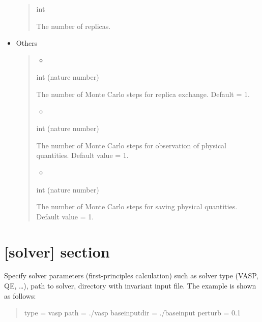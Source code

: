 \documentclass[letterpaper,10pt,english]{sphinxmanual}
\begin{document}
\begin{itemize}
\begin{quote}
 int

 The number of replicas.
\end{quote}

\item {} 
Others
\begin{quote}
\begin{itemize}
\item {} 

\end{itemize}

 int (nature number)

 The number of Monte Carlo steps for replica exchange. Default = 1.
\begin{itemize}
\item {} 

\end{itemize}

 int (nature number)

     The number of Monte Carlo steps for observation of physical quantities. Default value = 1.
\begin{itemize}
\item {} 

\end{itemize}

 int (nature number)

     The number of Monte Carlo steps for saving physical quantities. Default value = 1.
\end{quote}

\end{itemize}


\section{{[}solver{]} section}
\label{\detokenize{file_specification/parameter_solver:solver-section}}\label{\detokenize{file_specification/parameter_solver::doc}}
Specify solver parameters (first-principles calculation) such as solver type (VASP, QE, …), path to solver, directory with invariant input file.
The example is shown as follows:
\begin{quote}

\begin{sphinxVerbatim}[commandchars=\\\{\}]
[solver]
type = \PYGZsq{}vasp\PYGZsq{}
path = \PYGZsq{}./vasp\PYGZsq{}
base\PYGZus{}input\PYGZus{}dir = \PYGZsq{}./baseinput\PYGZsq{}
perturb = 0.1
\end{sphinxVerbatim}
\end{quote}
\end{document}
